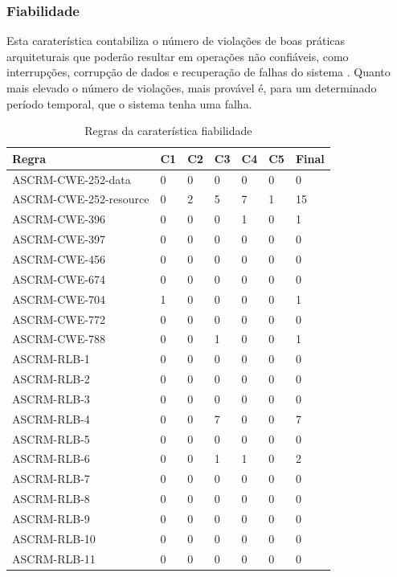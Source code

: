 \documentclass[openany,10pt,a4paper]{article}
\begin{document}
\subsubsection{Fiabilidade}
Esta caraterística contabiliza o número de violações de boas práticas arquiteturais que poderão resultar em operações não confiáveis, como interrupções, corrupção de dados e recuperação de falhas do sistema \cite{OMG_Reliability}. Quanto mais elevado o número de violações, mais provável é, para um determinado período temporal, que o sistema tenha uma falha. 
\begin{longtable}{p{1.9in}|p{0.28in}|p{0.28in}|p{0.28in}|p{0.28in}|p{0.28in}|p{0.35in}}
	\caption{Regras da caraterística fiabilidade}
	\label{table_Reliability}
	\endhead
	\hline	
		\textbf{Regra} & \textbf{C1} & \textbf{C2} & \textbf{C3} & \textbf{C4} & \textbf{C5} & \textbf{Final} \\ \hline
ASCRM-CWE-252-data & 0 & 0 & 0 & 0 & 0 & 0 \\ \hline
ASCRM-CWE-252-resource & 0 & 2 & 5 & 7 & 1 & 15 \\ \hline
ASCRM-CWE-396 & 0 & 0 & 0 & 1 & 0 & 1 \\ \hline
ASCRM-CWE-397 & 0 & 0 & 0 & 0 & 0 & 0 \\ \hline
ASCRM-CWE-456 & 0 & 0 & 0 & 0 & 0 & 0 \\ \hline
ASCRM-CWE-674 & 0 & 0 & 0 & 0 & 0 & 0 \\ \hline
ASCRM-CWE-704 & 1 & 0 & 0 & 0 & 0 & 1 \\ \hline
ASCRM-CWE-772 & 0 & 0 & 0 & 0 & 0 & 0 \\ \hline
ASCRM-CWE-788 & 0 & 0 & 1 & 0 & 0 & 1 \\ \hline
ASCRM-RLB-1 & 0 & 0 & 0 & 0 & 0 & 0 \\ \hline
ASCRM-RLB-2 & 0 & 0 & 0 & 0 & 0 & 0 \\ \hline
ASCRM-RLB-3 & 0 & 0 & 0 & 0 & 0 & 0 \\ \hline
ASCRM-RLB-4 & 0 & 0 & 7 & 0 & 0 & 7 \\ \hline
ASCRM-RLB-5 & 0 & 0 & 0 & 0 & 0 & 0 \\ \hline
ASCRM-RLB-6 & 0 & 0 & 1 & 1 & 0 & 2 \\ \hline
ASCRM-RLB-7 & 0 & 0 & 0 & 0 & 0 & 0 \\ \hline
ASCRM-RLB-8 & 0 & 0 & 0 & 0 & 0 & 0 \\ \hline
ASCRM-RLB-9 & 0 & 0 & 0 & 0 & 0 & 0 \\ \hline
ASCRM-RLB-10 & 0 & 0 & 0 & 0 & 0 & 0 \\ \hline
ASCRM-RLB-11 & 0 & 0 & 0 & 0 & 0 & 0 \\ \hline

\end{longtable}
\end{document}
